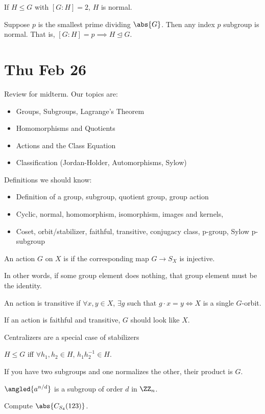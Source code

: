 \documentclass{article}
\begin{document}
\begin{theorem}
If $H \leq G$ with $[G:H] = 2$, $H$ is normal. 
\end{theorem}

\begin{theorem}
  Suppose $p$ is the smallest prime dividing $\abs{G}$. Then any index $p$ subgroup is normal. That is, $[G:H]=p \implies H \trianglelefteq G$. 
\end{theorem}

\section{Thu Feb 26}
Review for midterm.
Our topics are:
\begin{itemize}
\item Groups, Subgroups, Lagrange's Theorem 
\item Homomorphisms and Quotients
\item Actions and the Class Equation
\item Classification (Jordan-Holder, Automorphisms, Sylow)
\end{itemize}
Definitions we should know:
\begin{itemize}
\item Definition of a group, subgroup, quotient group, group action
\item Cyclic, normal, homomorphism, isomorphism, images and kernels, 
\item Coset, orbit/stabilizer, faithful, transitive, conjugacy class, p-group, Sylow p-subgroup
\end{itemize}
\begin{definition}
  An action $G$ on $X$ is  if the corresponding map $G \to S_X$ is injective. 
\end{definition}
In other words, if some group element does nothing, that group element must be the identity.
\begin{definition}
 An action is transitive if $\forall x, y \in X$, $\exists g$ such that $g \cdot x = y \iff X$ is a single $G$-orbit. 
\end{definition}
If an action is faithful and transitive, $G$ should look like $X$.

Centralizers are a special case of stabilizers

$H \leq G$ iff $\forall h_1, h_2 \in H$, $h_1 h_2^{-1} \in H$.

If you have two subgroups and one normalizes the other, their product is $G$.

$\angled{a^{n/d}}$ is a subgroup of order $d$ in $\ZZ_n$.

\begin{example}
  Compute $\abs{C_{S_4}(123)}$. 
\end{example}
\end{document}
